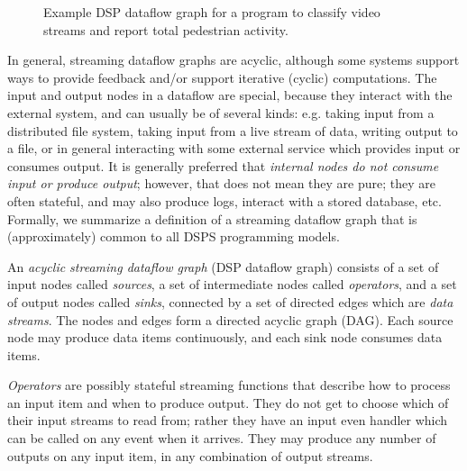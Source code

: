 \begin{figure}[t]
\centering
{}

\caption[Example dataflow graph.]{Example DSP dataflow graph for a program to classify video streams and report total pedestrian activity.}
\label{fig:dataflow-example}
\end{figure}

In general, streaming dataflow graphs are acyclic, although some systems support ways to provide feedback and/or support iterative (cyclic) computations.
The input and output nodes in a dataflow are special, because they interact with the external system, and can usually be of several kinds: e.g. taking input from a distributed file system, taking input from a live stream of data, writing output to a file, or in general interacting with some external service which provides input or consumes output.
It is generally preferred that \emph{internal nodes do not consume input or produce output}; however, that does not mean they are pure; they are often stateful, and may also produce logs, interact with a stored database, etc.
Formally, we summarize a definition of a streaming dataflow graph that is (approximately) common to all DSPS programming models.

\begin{definition}
\label{def:dataflow-graph}
An \emph{acyclic streaming dataflow graph} (DSP dataflow graph) consists of a set of input nodes called \emph{sources}, a set of intermediate nodes
called \emph{operators}, and a set of output nodes called \emph{sinks}, connected by a set of
directed edges which are \emph{data streams}.
The nodes and edges form a directed acyclic graph (DAG).
Each source node may produce data items continuously, and each sink node consumes data items.

\emph{Operators} are possibly stateful streaming functions that describe how to process an input item and when to produce output. They do not get to choose which of their input streams to read from; rather they have an input even handler which can be called on any event when it arrives.
They may produce any number of outputs on any input item, in any combination of output streams.
\end{definition}

